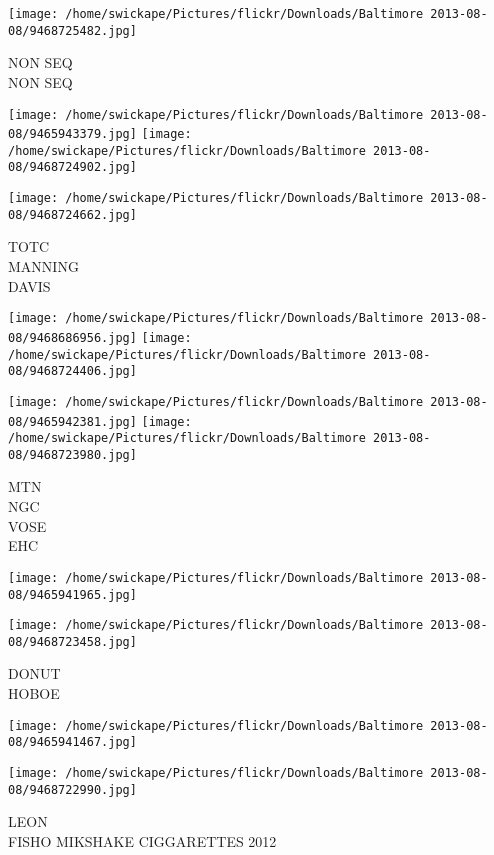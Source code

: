 \documentclass[10pt,letterpaper]{article}
\begin{document}
\vspace{0.25in}
\texttt{[image: /home/swickape/Pictures/flickr/Downloads/Baltimore 2013-08-08/9468725482.jpg]}

NON SEQ\\
NON SEQ
\pagebreak

\texttt{[image: /home/swickape/Pictures/flickr/Downloads/Baltimore 2013-08-08/9465943379.jpg]}
\texttt{[image: /home/swickape/Pictures/flickr/Downloads/Baltimore 2013-08-08/9468724902.jpg]}

\vspace{0.25in}
\texttt{[image: /home/swickape/Pictures/flickr/Downloads/Baltimore 2013-08-08/9468724662.jpg]}

TOTC\\
MANNING\\
DAVIS
\pagebreak

\texttt{[image: /home/swickape/Pictures/flickr/Downloads/Baltimore 2013-08-08/9468686956.jpg]}
\texttt{[image: /home/swickape/Pictures/flickr/Downloads/Baltimore 2013-08-08/9468724406.jpg]}

\texttt{[image: /home/swickape/Pictures/flickr/Downloads/Baltimore 2013-08-08/9465942381.jpg]}
\texttt{[image: /home/swickape/Pictures/flickr/Downloads/Baltimore 2013-08-08/9468723980.jpg]}

MTN\\
NGC\\
VOSE\\
EHC
\pagebreak

\texttt{[image: /home/swickape/Pictures/flickr/Downloads/Baltimore 2013-08-08/9465941965.jpg]}

\vspace{0.25in}
\texttt{[image: /home/swickape/Pictures/flickr/Downloads/Baltimore 2013-08-08/9468723458.jpg]}

DONUT\\
HOBOE
\pagebreak

\texttt{[image: /home/swickape/Pictures/flickr/Downloads/Baltimore 2013-08-08/9465941467.jpg]}

\vspace{0.25in}
\texttt{[image: /home/swickape/Pictures/flickr/Downloads/Baltimore 2013-08-08/9468722990.jpg]}

LEON\\
FISHO MIKSHAKE CIGGARETTES 2012
\pagebreak
\end{document}
